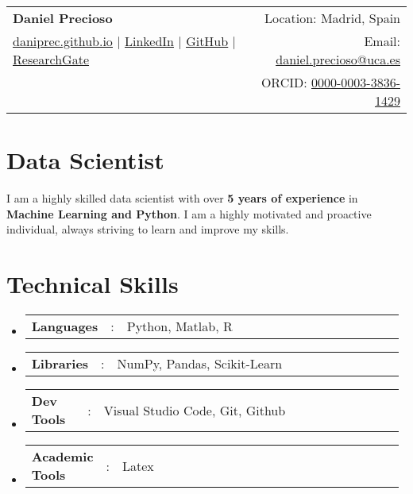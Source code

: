 \documentclass[a4paper,11pt]{article}
\newcommand{\resumeSectionType}[3]{
	\item\begin{tabular*}{0.96\textwidth}[t]{
			p{0.15\linewidth}p{0.02\linewidth}p{0.81\linewidth}
		}
		\textbf{#1} & #2 & #3
	\end{tabular*}\vspace{-2pt}
}
\newcommand{\resumeHeadingListStart}{
	\begin{itemize}[leftmargin=0.15in, label={}]
	}
\newcommand{\resumeHeadingListEnd}{\end{itemize}}
\begin{document}
	
	
	\begin{tabular*}{\textwidth}{l@{\extracolsep{\fill}}r}
		\textbf{\Huge Daniel Precioso \vspace{2pt}} & %
		Location: Madrid, Spain \\ %
		\href{https://daniprec.github.io}{\uline{daniprec.github.io}} $|$ %
		\href{https://www.linkedin.com/in/daniel-precioso-garcelan}{\uline{LinkedIn}} $|$ %
		\href{https://github.com/daniprec}{\uline{GitHub}} %
		$|$ \href{https://www.researchgate.net/profile/Daniel-Precioso-Garcelan}{\uline{ResearchGate}} %
		& %
		Email: \href{mailto:daniel.precioso@uca.es}{\uline{daniel.precioso@uca.es}} \\ %
		& %
		ORCID: \href{https://orcid.org/0000-0003-3836-1429}{\uline{0000-0003-3836-1429}} \\ %
	\end{tabular*}
	
	
	
	\section{Data Scientist}
		 I am a highly skilled data scientist with over \textbf{5 years of experience} in \textbf{Machine Learning and Python}. I am a highly motivated and proactive individual, always striving to learn and improve my skills. %
	
	
	
	\section{Technical Skills}
	\resumeHeadingListStart{}
	\resumeSectionType{Languages}{:}{Python, Matlab, R}
	\resumeSectionType{Libraries}{:}{NumPy, Pandas, Scikit-Learn}
	\resumeSectionType{Dev Tools}{:}{Visual Studio Code, Git, Github}
	\resumeSectionType{Academic Tools}{:}{Latex}
	\resumeHeadingListEnd{}
	
\end{document}
